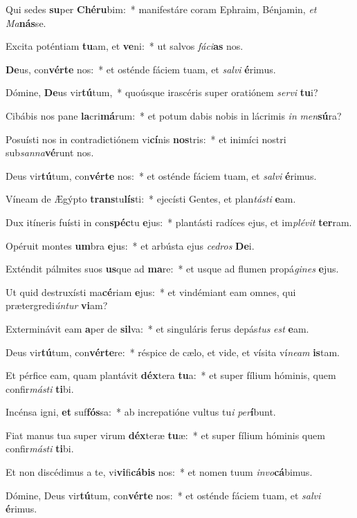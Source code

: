 \item Qui sedes \textbf{su}per \textbf{Ché}\textbf{ru}bim:~* manifestáre coram Ephraim, Bénjamin, \textit{et} \textit{Ma}\textbf{nás}se.
\item Excita poténtiam \textbf{tu}am, et \textbf{ve}ni:~* ut salvos \textit{fá}\textit{ci}\textbf{as} nos.
\item \textbf{De}us, con\textbf{vér}\textbf{te} nos:~* et osténde fáciem tuam, et \textit{sal}\textit{vi} \textbf{é}rimus.
\item Dómine, \textbf{De}us vir\textbf{tú}tum,~* quoúsque irascéris super oratiónem \textit{ser}\textit{vi} \textbf{tu}i?
\item Cibábis nos pane \textbf{la}cri\textbf{má}rum:~* et potum dabis nobis in lácrimis \textit{in} \textit{men}\textbf{sú}ra?
\item Posuísti nos in contradictiónem vi\textbf{cí}nis \textbf{nos}tris:~* et inimíci nostri sub\textit{san}\textit{na}\textbf{vé}runt nos.
\item Deus vir\textbf{tú}tum, con\textbf{vér}\textbf{te} nos:~* et osténde fáciem tuam, et \textit{sal}\textit{vi} \textbf{é}rimus.
\item Víneam de Ægýpto \textbf{trans}tu\textbf{lís}ti:~* ejecísti Gentes, et plan\textit{tás}\textit{ti} \textbf{e}am.
\item Dux itíneris fuísti in con\textbf{spéc}tu \textbf{e}jus:~* plantásti radíces ejus, et im\textit{plé}\textit{vit} \textbf{ter}ram.
\item Opéruit montes \textbf{um}bra \textbf{e}jus:~* et arbústa ejus \textit{ce}\textit{dros} \textbf{De}i.
\item Exténdit pálmites suos \textbf{us}que ad \textbf{ma}re:~* et usque ad flumen propá\textit{gi}\textit{nes} \textbf{e}jus.
\item Ut quid destruxísti ma\textbf{cé}riam \textbf{e}jus:~* et vindémiant eam omnes, qui prætergredi\textit{ún}\textit{tur} \textbf{vi}am?
\item Exterminávit eam \textbf{a}per de \textbf{sil}va:~* et singuláris ferus depás\textit{tus} \textit{est} \textbf{e}am.
\item Deus vir\textbf{tú}tum, con\textbf{vér}\textbf{te}re:~* réspice de cælo, et vide, et vísita ví\textit{ne}\textit{am} \textbf{is}tam.
\item Et pérfice eam, quam plantávit \textbf{déx}tera \textbf{tu}a:~* et super fílium hóminis, quem confir\textit{más}\textit{ti} \textbf{ti}bi.
\item Incénsa igni, \textbf{et} suf\textbf{fós}sa:~* ab increpatióne vultus tu\textit{i} \textit{per}\textbf{í}bunt.
\item Fiat manus tua super virum \textbf{déx}teræ \textbf{tu}æ:~* et super fílium hóminis quem confir\textit{más}\textit{ti} \textbf{ti}bi.
\item Et non discédimus a te, vi\textbf{vi}fi\textbf{cá}\textbf{bis} nos:~* et nomen tuum \textit{in}\textit{vo}\textbf{cá}bimus.
\item Dómine, Deus vir\textbf{tú}tum, con\textbf{vér}\textbf{te} nos:~* et osténde fáciem tuam, et \textit{sal}\textit{vi} \textbf{é}rimus.

